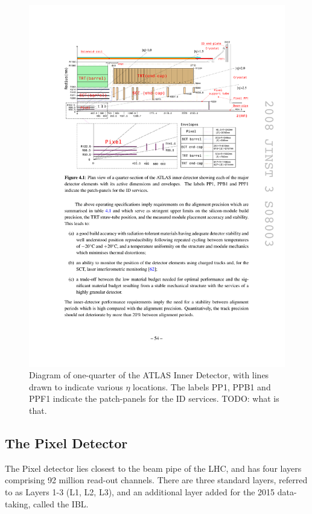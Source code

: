 \begin{centering}
\begin{figure}[bth]
\myfloatalign
\includegraphics[width=.90\linewidth]{figures/atlas/ideta.pdf}
\caption{Diagram of one-quarter of the ATLAS Inner Detector, with lines drawn to indicate various $\eta$ locations. The labels PP1, PPB1 and PPF1 indicate the patch-panels for the ID services. TODO: what is that.}
\label{fig:IDeta}
\end{figure}
\end{centering}

\subsection{The Pixel Detector}

The Pixel detector lies closest to the beam pipe of the \ac{LHC}, and has four layers comprising 92 million read-out channels. There are three standard layers, referred to as Layers 1-3 (L1, L2, L3), and an additional layer added for the 2015 data-taking, called the \ac{IBL}. 

